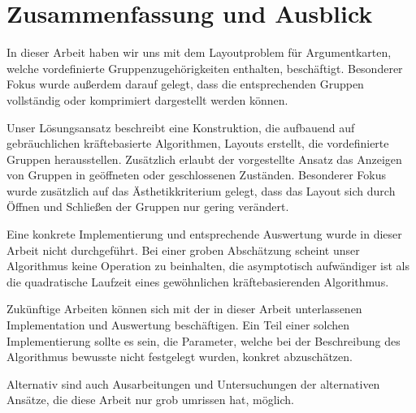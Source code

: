 \chapter{Zusammenfassung und Ausblick}
\label{ch:zsf}

In dieser Arbeit haben wir uns mit dem Layoutproblem für Argumentkarten, welche vordefinierte Gruppenzugehörigkeiten enthalten, beschäftigt. Besonderer Fokus wurde außerdem darauf gelegt, dass die entsprechenden Gruppen vollständig oder komprimiert dargestellt werden können. 


Unser Lösungsansatz beschreibt eine Konstruktion, die aufbauend auf gebräuchlichen kräftebasierte Algorithmen, Layouts erstellt, die vordefinierte Gruppen herausstellen. Zusätzlich erlaubt der vorgestellte Ansatz das Anzeigen von Gruppen in geöffneten oder geschlossenen Zuständen. Besonderer Fokus wurde zusätzlich auf das Ästhetikkriterium gelegt, dass das Layout sich durch Öffnen und Schließen der Gruppen nur gering verändert.

Eine konkrete Implementierung und entsprechende Auswertung wurde in dieser Arbeit nicht durchgeführt.
Bei einer groben Abschätzung scheint unser Algorithmus keine Operation zu beinhalten, die asymptotisch aufwändiger ist als die quadratische Laufzeit eines gewöhnlichen kräftebasierenden Algorithmus.

Zukünftige Arbeiten können sich mit der in dieser Arbeit unterlassenen Implementation und Auswertung beschäftigen. Ein Teil einer solchen Implementierung sollte es sein, die Parameter, welche bei der Beschreibung des Algorithmus bewusste nicht festgelegt wurden, konkret abzuschätzen.

Alternativ sind auch Ausarbeitungen und Untersuchungen der alternativen Ansätze, die diese Arbeit nur grob umrissen hat, möglich.

